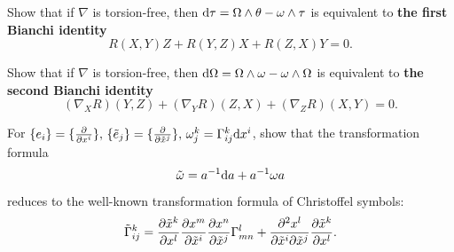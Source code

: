 \begin{exercise}
    Show that if $\nabla$ is torsion-free, then ${\rm d}\tau=\Omega\wedge\theta-\omega\wedge\tau$ 
    is equivalent to \textbf{the first Bianchi identity}
    \begin{equation*}
        R(X,Y)Z + R(Y,Z)X + R(Z,X)Y = 0.
    \end{equation*}
\end{exercise}

\begin{exercise}
    Show that if $\nabla$ is torsion-free, then ${\rm d}\Omega=\Omega\wedge\omega-\omega\wedge\Omega$ 
    is equivalent to \textbf{the second Bianchi identity}
    \begin{equation*}
        (\nabla_X R)(Y,Z) + (\nabla_Y R)(Z,X) + (\nabla_Z R)(X,Y) = 0.
    \end{equation*}
\end{exercise}

\begin{exercise}
    For $\{e_i\}=\{\frac{\partial}{\partial x^i}\},\,\{\tilde{e}_j\}=\{\frac{\partial}{\partial \tilde{x}^j}\},
    \,\omega^k_j=\Gamma^{k}_{ij}{\rm d} x^i$, show that the transformation formula 
    \begin{equation*}
        \tilde{\omega} = a^{-1} {\rm d} a + a^{-1} \omega a
    \end{equation*}
    reduces to the well-known transformation formula of Christoffel symbols:
    \begin{equation*}
        \tilde{\Gamma}_{ij}^k 
        = \frac{\partial \tilde{x}^k}{\partial x^l}\frac{\partial x^m}{\partial \tilde{x}^i}\frac{\partial x^n}{\partial \tilde{x}^j}\Gamma_{mn}^l 
        + \frac{\partial^2 x^l}{\partial \tilde{x}^i \partial \tilde{x}^j} \frac{\partial \tilde{x}^k}{\partial x^l}.
    \end{equation*}
\end{exercise}


